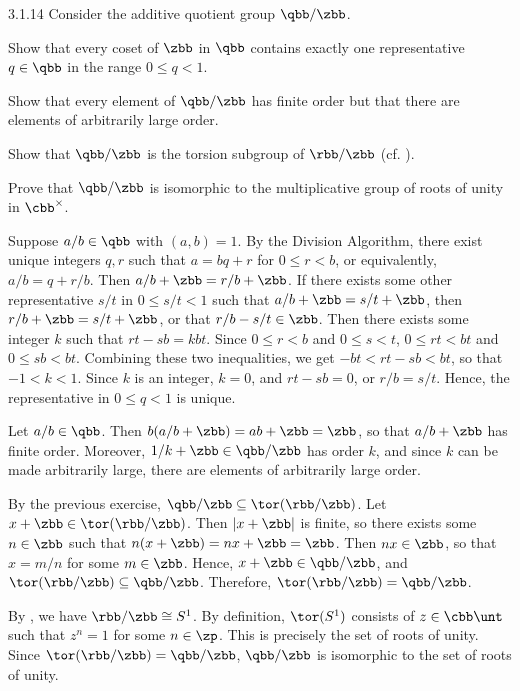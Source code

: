 \begin{spex}{3.1.14}
    Consider the additive quotient group $\qbb/\zbb$.
    \begin{subexercises}
        \item Show that every coset of $\zbb$ in $\qbb$ contains exactly one representative $q \in \qbb$ in the range $0 \le q < 1$.
        \item Show that every element of $\qbb/\zbb$ has finite order but that there are elements of arbitrarily large order.
        \item Show that $\qbb/\zbb$ is the torsion subgroup of $\rbb/\zbb$ (cf. ).
        \item Prove that $\qbb/\zbb$ is isomorphic to the multiplicative group of roots of unity in $\cbb^\times$.
    \end{subexercises}
\end{spex}

\begin{solenum}[spsol]
    \item Suppose $a/b \in \qbb$ with $(a, b) = 1$.
	By the Division Algorithm, there exist unique integers $q, r$ such that $a = bq + r$ for $0 \leq r < b$, or equivalently, $a/b = q + r/b$.
	Then $a/b + \zbb = r/b + \zbb$.
	If there exists some other representative $s/t$ in $0 \leq s/t < 1$ such that $a/b + \zbb = s/t + \zbb$, then $r/b + \zbb = s/t + \zbb$, or that $r/b - s/t \in \zbb$.
	Then there exists some integer $k$ such that $rt - sb = kbt$.
	Since $0 \leq r < b$ and $0 \leq s < t$, $0 \leq rt < bt$ and $0 \leq sb < bt$.
	Combining these two inequalities, we get $-bt < rt - sb < bt$, so that $-1 < k < 1$.
	Since $k$ is an integer, $k = 0$, and $rt - sb = 0$, or $r/b = s/t$.
	Hence, the representative in $0 \leq q < 1$ is unique.
    \item Let $a/b \in \qbb$.
	Then $b(a/b + \zbb) = ab + \zbb = \zbb$, so that $a/b + \zbb$ has finite order.
	Moreover, $1/k + \zbb \in \qbb/\zbb$ has order $k$, and since $k$ can be made arbitrarily large, there are elements of arbitrarily large order.
    \item By the previous exercise, $\qbb/\zbb \subseteq \tor(\rbb/\zbb)$.
	Let $x + \zbb \in \tor(\rbb/\zbb)$.
	Then $|x + \zbb|$ is finite, so there exists some $n \in \zbb$ such that $n(x + \zbb) = nx + \zbb = \zbb$.
	Then $nx \in \zbb$, so that $x = m/n$ for some $m \in \zbb$.
	Hence, $x + \zbb \in \qbb/\zbb$, and $\tor(\rbb/\zbb) \subseteq \qbb/\zbb$.
	Therefore, $\tor(\rbb/\zbb) = \qbb/\zbb$.
    \item By , we have $\rbb/\zbb \cong S^1$.
	By definition, $\tor(S^1)$ consists of $z \in \cbb\unt$ such that $z^n = 1$ for some $n \in \zp$.
	This is precisely the set of roots of unity.
	Since $\tor(\rbb/\zbb) = \qbb/\zbb$, $\qbb/\zbb$ is isomorphic to the set of roots of unity.
\end{solenum}

